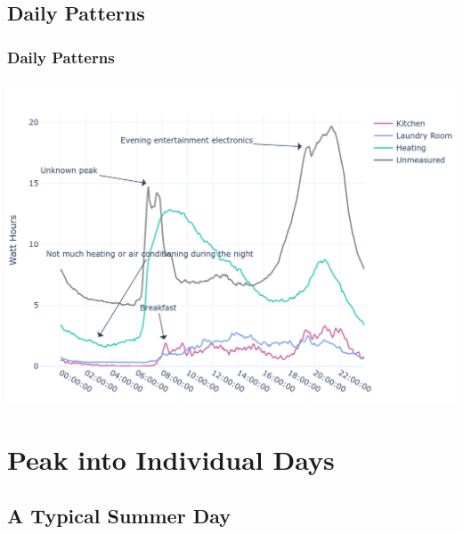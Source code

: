 \documentclass[10pt]{beamer}
\begin{document}
\subsection{Daily Patterns}

\begin{frame}
\frametitle{Daily Patterns}

\bigskip
{
    \centering
    \includegraphics[width=\textwidth,height=\textheight,keepaspectratio]{daily_seasonality.png}
    \par
}
\bigskip

\end{frame}


\section{Peak into Individual Days}

\subsection{A Typical Summer Day}
\end{document}
